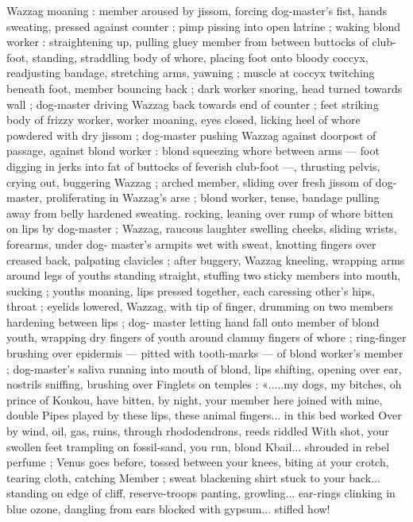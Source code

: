 Wazzag moaning : member aroused by jissom, forcing dog-master’s
fist, hands sweating, pressed against counter ; pimp pissing into
open latrine ; waking blond worker : straightening up, pulling gluey
member from between buttocks of club-foot, standing, straddling
body of whore, placing foot onto bloody coccyx, readjusting
bandage, stretching arms, yawning ; muscle at coccyx twitching
beneath foot, member bouncing back ; dark worker snoring, head
turned towards wall ; dog-master driving Wazzag back towards end
of counter ; feet striking body of frizzy worker, worker moaning, eyes
closed, licking heel of whore powdered with dry jissom ; dog-master
pushing Wazzag against doorpost of passage, against blond worker
: blond squeezing whore between arms --- foot digging in jerks into
fat of buttocks of feverish club-foot ---, thrusting pelvis, crying out,
buggering Wazzag ; arched member, sliding over fresh jissom of dog-
master, proliferating in Wazzag's arse ; blond worker, tense, bandage
pulling away from belly hardened sweating. rocking, leaning over
rump of whore bitten on lips by dog-master ; Wazzag, raucous
laughter swelling cheeks, sliding wrists, forearms, under dog-
master's armpits wet with sweat, knotting fingers over creased back,
palpating clavicles ; after buggery, Wazzag kneeling, wrapping arms
around legs of youths standing straight, stuffing two sticky members
into mouth, sucking ; youths moaning, lips pressed together, each
caressing other's hips, throat ; eyelids lowered, Wazzag, with tip of
finger, drumming on two members hardening between lips ; dog-
master letting hand fall onto member of blond youth, wrapping dry
fingers of youth around clammy fingers of whore ; ring-finger
brushing over epidermis --- pitted with tooth-marks --- of blond
worker's member ; dog-master's saliva running into mouth of blond,
lips shifting, opening over ear, nostrils sniffing, brushing over
Finglets on temples : «.....my dogs, my bitches, oh prince of Koukou,
have bitten, by night, your member here joined with mine, double
Pipes played by these lips, these animal fingers... in this bed worked
Over by wind, oil, gas, ruins, through rhododendrons, reeds riddled
With shot, your swollen feet trampling on fossil-sand, you run, blond
Kbail... shrouded in rebel perfume ; Venus goes before, tossed
between your knees, biting at your crotch, tearing cloth, catching
Member ; sweat blackening shirt stuck to your back... standing on
edge of cliff, reserve-troops panting, growling... ear-rings clinking in
blue ozone, dangling from ears blocked with gypsum... stifled how!
